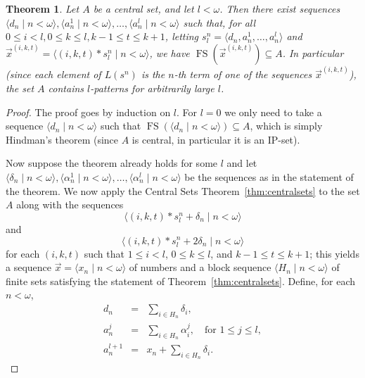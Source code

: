 \documentclass[10pt,a4paper]{amsart}
\newtheorem{theorem}{Theorem}
\newcommand{\fs}{\mathop{\mathrm{FS}}}
\begin{document}
\begin{theorem}\label{thm:arbitrarilylong}
Let $A$ be a central set, and let $l<\omega$. Then there exist sequences $\langle d_n\mid n<\omega\rangle,\langle a_n^1\mid n<\omega\rangle,\ldots,\langle a_n^l\mid n<\omega\rangle$ such that, for all $0\leq i<l,0\leq k\leq l,k-1\leq t\leq k+1$, letting $s_l^n=\langle d_n,a_n^1,\ldots,a_n^l\rangle$ and $\vec{x}^{(i,k,t)}=\langle (i,k,t)*s_l^n\mid n<\omega\rangle$, we have $\fs(\vec{x}^{(i,k,t)})\subseteq A$. In particular (since each element of $L(s^n)$ is the $n$-th term of one of the sequences $\vec{x}^{(i,k,t)}$), the set $A$ contains $l$-patterns for arbitrarily large $l$.
\end{theorem}

\begin{proof}
The proof goes by induction on $l$. For $l=0$ we only need to take a sequence $\langle d_n\mid n<\omega\rangle$ such that $\fs(\langle d_n\mid n<\omega\rangle)\subseteq A$, which is simply Hindman's theorem (since $A$ is central, in particular it is an IP-set).

Now suppose the theorem already holds for some $l$ and let $\langle \delta_n\mid n<\omega\rangle,\langle \alpha_n^1\mid n<\omega\rangle,\ldots,\langle \alpha_n^l\mid n<\omega\rangle$ be the sequences as in the statement of the theorem. We now apply the Central Sets Theorem~\ref{thm:centralsets} to the set $A$ along with the sequences
\begin{equation*}
    \langle(i,k,t)*s_l^n+\delta_n\mid n<\omega\rangle
\end{equation*}
and
\begin{equation*}
    \langle(i,k,t)*s_l^n+2\delta_n\mid n<\omega\rangle
\end{equation*}
for each $(i,k,t)$ such that $1\leq i<l$, $0\leq k\leq l$, and $k-1\leq t\leq k+1$; this yields a sequence $\vec{x}=\langle x_n\mid n<\omega\rangle$ of numbers and a block sequence $\langle H_n\mid n<\omega\rangle$ of finite sets satisfying the statement of Theorem~\ref{thm:centralsets}. Define, for each $n<\omega$,
\begin{eqnarray*}
d_n & = & \sum_{i\in H_n}\delta_i, \\
a_n^j & = & \sum_{i\in H_n}\alpha_i^j, \ \ \ \text{ for }1\leq j\leq l, \\
a_n^{l+1} & = & x_n+\sum_{i\in H_n}\delta_i.
\end{eqnarray*}


\end{proof}
\end{document}
